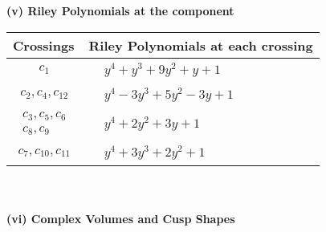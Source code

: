\documentclass[1p]{elsarticle_modified}
\theoremstyle{definition}
\begin{document}
\newpage\renewcommand{\arraystretch}{1}
\flushleft \textbf{(v) Riley Polynomials at the component}\newline \\
\begin{tabular}{m{50pt}|m{274pt}}
Crossings & \hspace{64pt}Riley Polynomials at each crossing \\
\hline $$\begin{aligned}c_{1}\end{aligned}$$&$\begin{aligned}
&y^4+y^3+9 y^2+y+1
\end{aligned}$\\
\hline $$\begin{aligned}c_{2},c_{4},c_{12}\end{aligned}$$&$\begin{aligned}
&y^4-3 y^3+5 y^2-3 y+1
\end{aligned}$\\
\hline $$\begin{aligned}c_{3},c_{5},c_{6}\\c_{8},c_{9}\end{aligned}$$&$\begin{aligned}
&y^4+2 y^2+3 y+1
\end{aligned}$\\
\hline $$\begin{aligned}c_{7},c_{10},c_{11}\end{aligned}$$&$\begin{aligned}
&y^4+3 y^3+2 y^2+1
\end{aligned}$\\
\hline
\end{tabular}\\~\\
\newpage\flushleft \textbf{(vi) Complex Volumes and Cusp Shapes}
\end{document}
